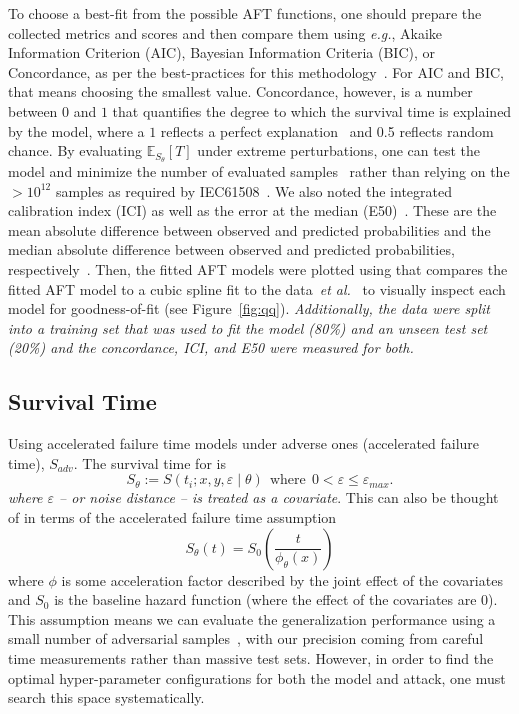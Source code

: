 \documentclass[conference]{IEEEtran}
\newcommand{\cm}[1]{\textit{{\color{blue}#1}}}
\begin{document}
{To choose a best-fit from the possible AFT functions, one should prepare the collected metrics and scores and then compare them using \textit{e.g.}, Akaike Information Criterion (AIC), Bayesian Information Criteria (BIC), or Concordance, as per the best-practices for this methodology~\cite{aft_models,kleinbaum1996survival}. For AIC and BIC, that means choosing the smallest value. Concordance, however, is a number between $0$ and $1$ that quantifies the degree to which the survival time is explained by the model, where a $1$ reflects a perfect explanation~\cite{kleinbaum1996survival} and 0.5 reflects random chance. By evaluating $\mathbb{E}_{S_\theta}[T]$ under extreme perturbations, one can test the model and minimize the number of evaluated samples~\cite{aft_models,kleinbaum1996survival} rather than relying on the $> 10^{12}$ samples as required by IEC61508~\cite{IEC61508}. We also noted the integrated calibration index (ICI) as well as the error at the median (E50)~\cite{ici}. These are the mean absolute difference between observed and predicted probabilities and the median absolute difference between observed and predicted probabilities, respectively~\cite{ici}. Then, the fitted AFT models were plotted using that compares the fitted AFT model to a cubic spline fit to the data~\textit{et al.}~\cite{ici}  to visually inspect each model for goodness-of-fit (see Figure~\ref{fig:qq}). \cm{Additionally, the data were split into a training set that was used to fit the model (80\%) and an unseen test set (20\%) and the concordance, ICI, and E50 were measured for both.}



\subsection{Survival Time}
\label{accelerated}

Using accelerated failure time models under adverse ones (accelerated failure time), $S_{adv}$. The survival time for is
$$
    S_{\theta} := S(t_i; x, y, \varepsilon \mid \theta) \mathrm{~~where~~} 0 < \varepsilon \leq \varepsilon_{max}.
$$
\cm{where $\varepsilon$ -- or noise distance -- is treated as a covariate}.
This can also be thought of in terms of the accelerated failure time assumption~\cite{kleinbaum1996survival}
\begin{equation} \label{assumption}
    S_\theta(t) = S_0 \left( \frac{t}{\phi_\theta(x)} \right)
\end{equation}
where $\phi$ is some acceleration factor described by the joint effect of the covariates and $S_0$ is the baseline hazard function (where the effect of the covariates are 0). This assumption means we can evaluate the generalization performance using a small number of adversarial samples~\cite{kleinbaum1996survival}, with our precision coming from careful time measurements rather than massive test sets.
However, in order to find the optimal hyper-parameter configurations for both the model and attack, one must search this space systematically.


}
\end{document}

